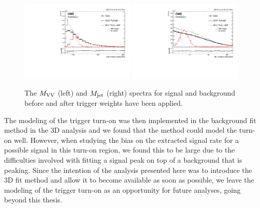 \begin{figure}[h!]
\centering
\includegraphics[width=0.49\textwidth]{figures/analysis/search3/B2G-18-002/trigWeightCompare_looseSel_Dijet_invariant_mass.pdf}
\includegraphics[width=0.49\textwidth]{figures/analysis/search3/B2G-18-002/trigWeightCompare_looseSel_Jet_1_softdrop_mass.pdf}
\caption{The $M_{\rm VV}$ (left) and $M_{\rm jet}$ (right) spectra for signal and background before and after trigger weights have been applied.}
\label{fig:triggerMCspectra}
\end{figure}
The modeling of the trigger turn-on was then implemented in the background fit method in the 3D analysis and we found that the method could model the turn-on well. However, when studying the bias on the extracted signal rate for a possible signal in this turn-on region, we found this to be large due to the difficulties involved with fitting a signal peak on top of a background that is peaking. Since the intention of the analysis presented here was to introduce the 3D fit method and allow it to become available as soon as possible, we leave the modeling of the trigger turn-on as an opportunity for future analyses, going beyond this thesis.
\clearpage


